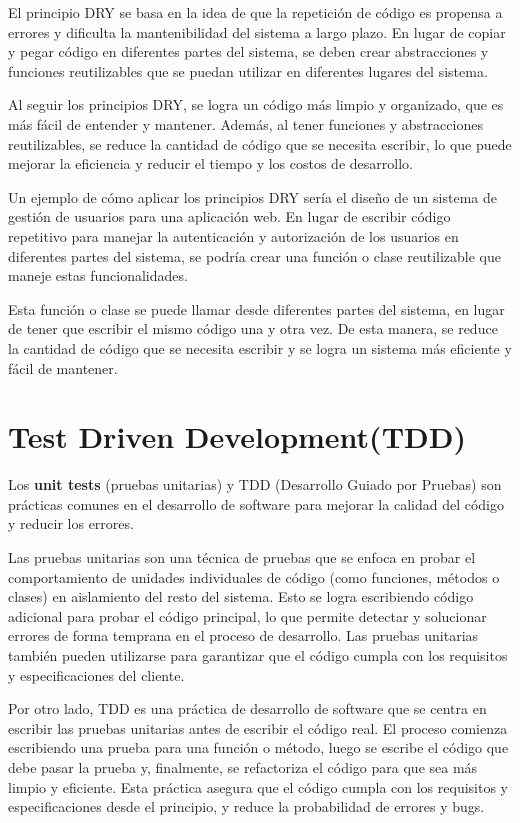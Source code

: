 \documentclass[executivepaper]{article}
\begin{document}
El principio DRY se basa en la idea de que la repetición de código es propensa a errores y dificulta la mantenibilidad del sistema a largo plazo. En lugar de copiar y pegar código en diferentes partes del sistema, se deben crear abstracciones y funciones reutilizables que se puedan utilizar en diferentes lugares del sistema.

Al seguir los principios DRY, se logra un código más limpio y organizado, que es más fácil de entender y mantener. Además, al tener funciones y abstracciones reutilizables, se reduce la cantidad de código que se necesita escribir, lo que puede mejorar la eficiencia y reducir el tiempo y los costos de desarrollo.

Un ejemplo de cómo aplicar los principios DRY sería el diseño de un sistema de gestión de usuarios para una aplicación web. En lugar de escribir código repetitivo para manejar la autenticación y autorización de los usuarios en diferentes partes del sistema, se podría crear una función o clase reutilizable que maneje estas funcionalidades.

Esta función o clase se puede llamar desde diferentes partes del sistema, en lugar de tener que escribir el mismo código una y otra vez. De esta manera, se reduce la cantidad de código que se necesita escribir y se logra un sistema más eficiente y fácil de mantener.

\newpage
\section{Test Driven Development(TDD)}
Los \textbf{unit tests} (pruebas unitarias) y TDD (Desarrollo Guiado por Pruebas) son prácticas comunes en el desarrollo de software para mejorar la calidad del código y reducir los errores.

Las pruebas unitarias son una técnica de pruebas que se enfoca en probar el comportamiento de unidades individuales de código (como funciones, métodos o clases) en aislamiento del resto del sistema. Esto se logra escribiendo código adicional para probar el código principal, lo que permite detectar y solucionar errores de forma temprana en el proceso de desarrollo. Las pruebas unitarias también pueden utilizarse para garantizar que el código cumpla con los requisitos y especificaciones del cliente.

Por otro lado, TDD es una práctica de desarrollo de software que se centra en escribir las pruebas unitarias antes de escribir el código real. El proceso comienza escribiendo una prueba para una función o método, luego se escribe el código que debe pasar la prueba y, finalmente, se refactoriza el código para que sea más limpio y eficiente. Esta práctica asegura que el código cumpla con los requisitos y especificaciones desde el principio, y reduce la probabilidad de errores y bugs.
\end{document}
